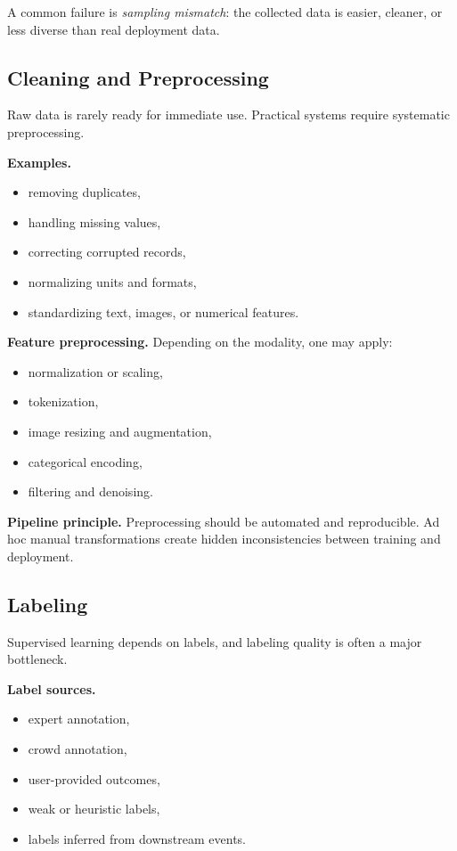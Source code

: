 \medskip

\noindent
A common failure is \emph{sampling mismatch}: the collected data is easier, cleaner, or less diverse than real deployment data.

\subsection{Cleaning and Preprocessing}

Raw data is rarely ready for immediate use. Practical systems require systematic preprocessing.

\medskip

\noindent
\textbf{Examples.}
\begin{itemize}
    \item removing duplicates,
    \item handling missing values,
    \item correcting corrupted records,
    \item normalizing units and formats,
    \item standardizing text, images, or numerical features.
\end{itemize}

\medskip

\noindent
\textbf{Feature preprocessing.}
Depending on the modality, one may apply:
\begin{itemize}
    \item normalization or scaling,
    \item tokenization,
    \item image resizing and augmentation,
    \item categorical encoding,
    \item filtering and denoising.
\end{itemize}

\medskip

\noindent
\textbf{Pipeline principle.}
Preprocessing should be automated and reproducible. Ad hoc manual transformations create hidden inconsistencies between training and deployment.

\subsection{Labeling}

Supervised learning depends on labels, and labeling quality is often a major bottleneck.

\medskip

\noindent
\textbf{Label sources.}
\begin{itemize}
    \item expert annotation,
    \item crowd annotation,
    \item user-provided outcomes,
    \item weak or heuristic labels,
    \item labels inferred from downstream events.
\end{itemize}

